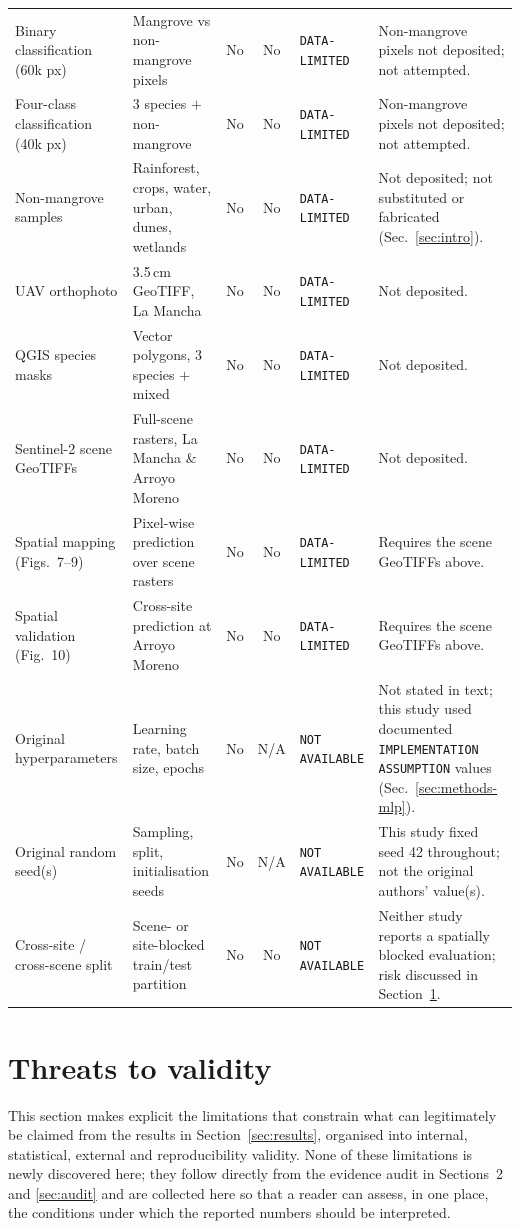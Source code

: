 \documentclass[10pt,twocolumn,a4paper]{article}
\newcommand{\evc}[1]{{\footnotesize\texttt{#1}}}
\begin{document}
\begin{table}[!t]
\begin{tabular}{p{2.55cm} p{3.55cm} c c p{2.15cm} p{5.0cm}}
Binary classification (60k px) & Mangrove vs non-mangrove pixels & No & No & \evc{DATA-LIMITED} & Non-mangrove pixels not deposited; not attempted. \\
Four-class classification (40k px) & 3 species $+$ non-mangrove & No & No & \evc{DATA-LIMITED} & Non-mangrove pixels not deposited; not attempted. \\
Non-mangrove samples & Rainforest, crops, water, urban, dunes, wetlands & No & No & \evc{DATA-LIMITED} & Not deposited; not substituted or fabricated (Sec.~\ref{sec:intro}). \\
UAV orthophoto & 3.5\,cm GeoTIFF, La Mancha & No & No & \evc{DATA-LIMITED} & Not deposited. \\
QGIS species masks & Vector polygons, 3 species $+$ mixed & No & No & \evc{DATA-LIMITED} & Not deposited. \\
Sentinel-2 scene GeoTIFFs & Full-scene rasters, La Mancha \& Arroyo Moreno & No & No & \evc{DATA-LIMITED} & Not deposited. \\
Spatial mapping (Figs.~7--9) & Pixel-wise prediction over scene rasters & No & No & \evc{DATA-LIMITED} & Requires the scene GeoTIFFs above. \\
Spatial validation (Fig.~10) & Cross-site prediction at Arroyo Moreno & No & No & \evc{DATA-LIMITED} & Requires the scene GeoTIFFs above. \\
Original hyperparameters & Learning rate, batch size, epochs & No & N/A & \evc{NOT AVAILABLE} & Not stated in text; this study used documented \evc{IMPLEMENTATION ASSUMPTION} values (Sec.~\ref{sec:methods-mlp}). \\
Original random seed(s) & Sampling, split, initialisation seeds & No & N/A & \evc{NOT AVAILABLE} & This study fixed seed 42 throughout; not the original authors' value(s). \\
Cross-site / cross-scene split & Scene- or site-blocked train/test partition & No & No & \evc{NOT AVAILABLE} & Neither study reports a spatially blocked evaluation; risk discussed in Section~\ref{sec:threats}. \\
\bottomrule
\end{tabular}
\end{table}

\section{Threats to validity}
\label{sec:threats}

This section makes explicit the limitations that constrain what can legitimately be claimed from
the results in Section~\ref{sec:results}, organised into internal, statistical, external and reproducibility
validity. None of these limitations is newly discovered here; they follow directly from the
evidence audit in Sections~2 and \ref{sec:audit} and are collected here so that a reader can assess,
in one place, the conditions under which the reported numbers should be interpreted.
\end{document}
